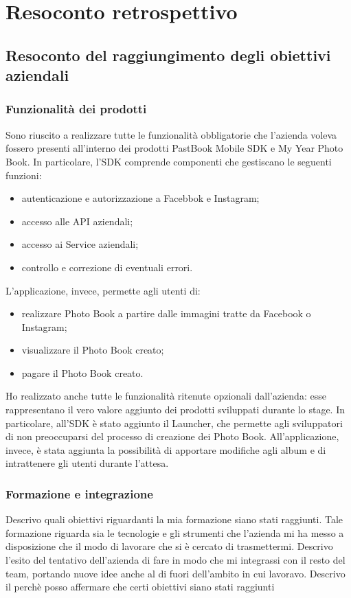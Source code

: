 \chapter{Resoconto retrospettivo}
	\section{Resoconto del raggiungimento degli obiettivi aziendali}
		\subsection{Funzionalità dei prodotti}
			Sono riuscito a realizzare tutte le funzionalità obbligatorie che l'azienda voleva fossero presenti all'interno dei prodotti
			PastBook Mobile SDK e My Year Photo Book. In particolare, l'SDK comprende componenti che gestiscano le seguenti funzioni:
			\begin{itemize}
				\item autenticazione e autorizzazione a Facebbok e Instagram;
				\item accesso alle API aziendali;
				\item accesso ai Service aziendali;
				\item controllo e correzione di eventuali errori.
			\end{itemize}
			L'applicazione, invece, permette agli utenti di:
			\begin{itemize}
				\item realizzare Photo Book a partire dalle immagini tratte da Facebook o Instagram;
				\item visualizzare il Photo Book creato;
				\item pagare il Photo Book creato.
			\end{itemize}
			Ho realizzato anche tutte le funzionalità ritenute opzionali dall'azienda: esse rappresentano il vero valore aggiunto dei
			prodotti sviluppati durante lo stage. In particolare, all'SDK è stato aggiunto il Launcher, che permette agli sviluppatori di
			non preoccuparsi del processo di creazione dei Photo Book. All'applicazione, invece, è stata aggiunta la possibilità di
			apportare modifiche agli album e di intrattenere gli utenti durante l'attesa.
		\subsection{Formazione e integrazione}
			Descrivo quali obiettivi riguardanti la mia formazione siano stati raggiunti. Tale formazione riguarda sia le tecnologie e
			gli strumenti che l'azienda mi ha messo a disposizione che il modo di lavorare che si è cercato di trasmettermi. Descrivo
			l'esito del tentativo dell'azienda di fare in modo che mi integrassi con il resto del team, portando nuove idee anche al di
			fuori dell'ambito in cui lavoravo. Descrivo il perchè posso affermare che certi obiettivi siano stati raggiunti
